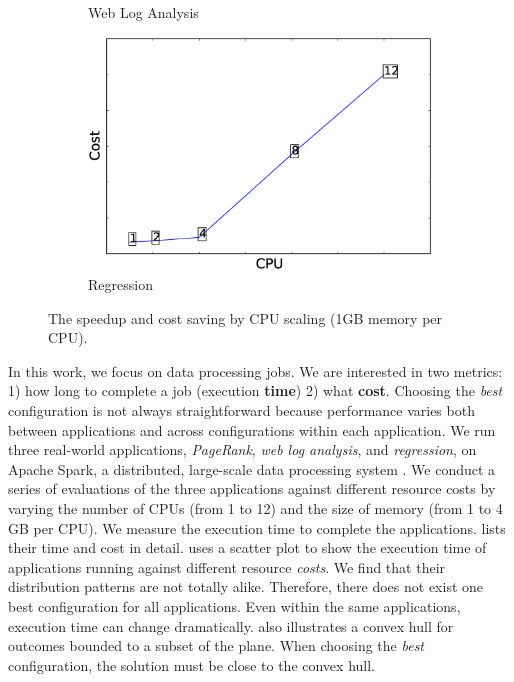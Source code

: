 \begin{figure}
\begin{subfigure}[b]{0.3\textwidth}
        \caption{Web Log Analysis}
        \label{fig:webloganalysis_cost}
    \end{subfigure}
    \begin{subfigure}[b]{0.3\textwidth}
        \includegraphics[width=\textwidth]{Chapter-CAT/figures/regression_cpu_cost_12_1.eps}
        \caption{Regression}
        \label{fig:regression_cost}
    \end{subfigure}
    \caption{The speedup and cost saving by CPU scaling (1GB memory per CPU).}
    \label{fig:speed_1gb}
\end{figure}





\iffalse
In this work, we focus on data processing jobs.
We are interested in two metrics:
1) how long to complete a job (execution \textbf{time})
2) what \textbf{cost}.
Choosing the \emph{best} configuration is not always straightforward because
performance varies both between applications and across configurations within each application.
We run three real-world applications,
\emph{PageRank},
\emph{web log analysis}, and
\emph{regression},
on Apache Spark, a distributed, large-scale data processing system \cite{spark}.
We conduct a series of evaluations of the three applications against
different resource costs by varying
the number of CPUs (from 1 to 12)
and
the size of memory (from 1 to 4 GB per CPU).
We measure the execution time to complete the applications.
\mytable{\ref{table:raw_data}} lists their time and cost in detail.
\myfigure{\ref{fig:application_performance}} uses a scatter plot
to show 
the execution time of applications running against different resource \emph{costs}.
We find that their distribution patterns are not totally alike.
Therefore, there does not exist one best configuration for all applications.
Even within the same applications, execution time can change dramatically.
\myfigure{\ref{fig:application_performance}} also illustrates a convex hull
for outcomes bounded to a subset of the plane.
When choosing the \emph{best} configuration, the solution must be close to the
convex hull.

